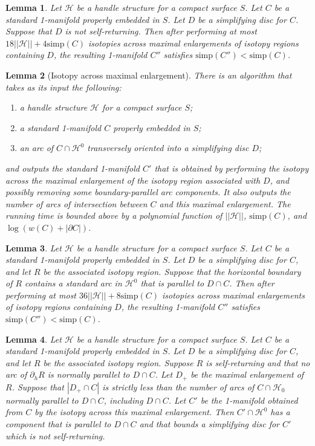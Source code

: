 \documentclass[10pt,a4paper]{amsart}
\newtheorem{lemma}{Lemma}
\newcommand{\calH}{\mathcal{H}}
\begin{document}
\begin{lemma}
\label{Lem:NotSelfReturning}
Let $\calH$ be a handle structure for a compact surface $S$. Let $C$ be a standard 1-manifold properly embedded in $S$. Let $D$ be a simplifying disc for $C$. Suppose that $D$ is not self-returning. Then after performing at most $18||\calH|| + 4\mathrm{simp}(C)$ isotopies across maximal enlargements of isotopy regions containing $D$, the resulting 1-manifold $C''$ satisfies $\mathrm{simp}(C'') < \mathrm{simp}(C)$.
\end{lemma}

\begin{lemma}[{\sc Isotopy across maximal enlargement}]
\label{Lem:IsotopyAcrossMaximalEnlargement}
There is an algorithm that takes as its input the following:
\begin{enumerate}
\item a handle structure $\calH$ for a compact surface $S$;
\item a standard 1-manifold $C$ properly embedded in $S$;
\item an arc of $C \cap \calH^0$ transversely oriented into a simplifying disc $D$;
\end{enumerate}
and outputs the standard 1-manifold $C'$ that is obtained by performing the isotopy across the maximal enlargement of the isotopy region associated with $D$,
and possibly removing some boundary-parallel arc components. It also outputs the number of arcs of intersection between $C$ and this maximal enlargement.
The running time is bounded above by a polynomial function of $||\calH||$, $\mathrm{simp}(C)$, and $\log (w(C) + |\partial C|)$.
\end{lemma}

\begin{lemma}
\label{Lem:SelfReturningHoriz}
Let $\calH$ be a handle structure for a compact surface $S$. Let $C$ be a standard 1-manifold properly embedded in $S$. Let $D$ be a simplifying disc for $C$, and let $R$ be the associated isotopy region. Suppose that the horizontal boundary of $R$ contains a standard arc in $\calH^0$ that is parallel to $D \cap C$. Then after performing at most $36||\calH|| + 8 \mathrm{simp}(C)$ isotopies across maximal enlargements of isotopy regions containing $D$, the resulting 1-manifold $C''$ satisfies ${\mathrm{simp}}(C'') < {\mathrm{simp}}(C)$.
\end{lemma}

\begin{lemma}
\label{Lem:SelfReturningNotReeb}
Let $\calH$ be a handle structure for a compact surface $S$. Let $C$ be a standard 1-manifold properly embedded in $S$. Let $D$ be a simplifying disc for $C$, and let $R$ be the associated isotopy region. Suppose $R$ is self-returning and that no arc of $\partial_hR$ is normally parallel to $D \cap C$. Let $D_+$ be the maximal enlargement of $R$. Suppose that $|D_+ \cap C|$ is strictly less than the number of arcs of $C \cap \calH_0$ normally parallel to $D \cap C$, including $D \cap C$. Let $C'$ be the 1-manifold obtained from $C$ by the isotopy across this maximal enlargement. Then $C' \cap \calH^0$ has a component that is parallel to $D \cap C$ and that bounds a simplifying disc for $C'$ which is not self-returning.
\end{lemma}
\end{document}

